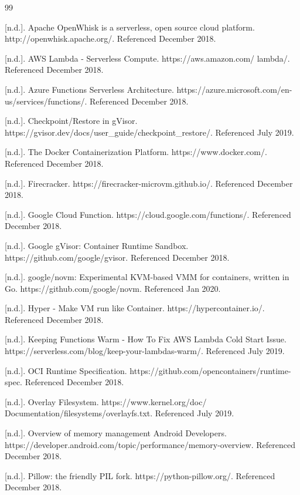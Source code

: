 \begin{thebibliography}{99}

 {[}n.d.{]}. Apache OpenWhisk is a serverless, open source cloud platform. http://openwhisk.apache.org/. Referenced December 2018.

 {[}n.d.{]}. AWS Lambda - Serverless Compute. https://aws.amazon.com/ lambda/. Referenced December 2018.

 {[}n.d.{]}. Azure Functions Serverless Architecture. https://azure.microsoft.com/en-us/services/functions/. Referenced December 2018.

 {[}n.d.{]}. Checkpoint/Restore in gVisor. https://gvisor.dev/docs/user\_guide/checkpoint\_restore/. Referenced July 2019.

 {[}n.d.{]}. The Docker Containerization Platform. https://www.docker.com/. Referenced December 2018.

 {[}n.d.{]}. Firecracker. https://firecracker-microvm.github.io/. Referenced December 2018.

 {[}n.d.{]}. Google Cloud Function. https://cloud.google.com/functions/. Referenced December 2018.

 {[}n.d.{]}. Google gVisor: Container Runtime Sandbox. https://github.com/google/gvisor. Referenced December 2018.

 {[}n.d.{]}. google/novm: Experimental KVM-based VMM for containers, written in Go. https://github.com/google/novm. Referenced Jan 2020.

 {[}n.d.{]}. Hyper - Make VM run like Container. https://hypercontainer.io/. Referenced December 2018.

 {[}n.d.{]}. Keeping Functions Warm - How To Fix AWS Lambda Cold Start Issue. https://serverless.com/blog/keep-your-lambdas-warm/. Referenced July 2019.

 {[}n.d.{]}. OCI Runtime Specification. https://github.com/opencontainers/runtime-spec. Referenced December 2018.

 {[}n.d.{]}. Overlay Filesystem. https://www.kernel.org/doc/ Documentation/filesystems/overlayfs.txt. Referenced July 2019.

 {[}n.d.{]}. Overview of memory management \textbar{} Android Developers. https://developer.android.com/topic/performance/memory-overview. Referenced December 2018.

 {[}n.d.{]}. Pillow: the friendly PIL fork. https://python-pillow.org/. Referenced December 2018.


\end{thebibliography}
